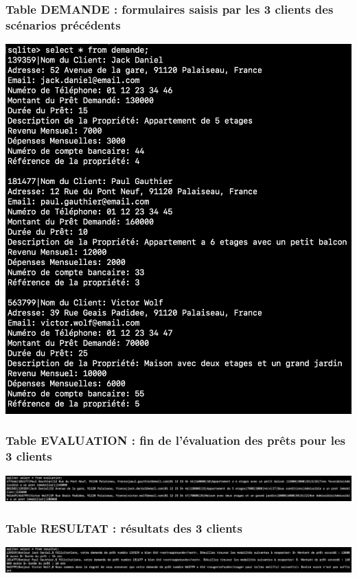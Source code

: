 \documentclass{article}
\begin{document}
    \subsubsection{Table DEMANDE : formulaires saisis par les 3 clients des scénarios précédents}
    \includegraphics[width=400pt]{Images/12.5/demandeSQL.png}
    
    \subsubsection{Table EVALUATION : fin de l'évaluation des prêts pour les 3 clients}
    \includegraphics[width=400pt]{Images/12.5/evaluationSQL.png}
    
    \subsubsection{Table RESULTAT : résultats des 3 clients}
    \includegraphics[width=400pt]{Images/12.5/resultatSQL.png}
\end{document}
